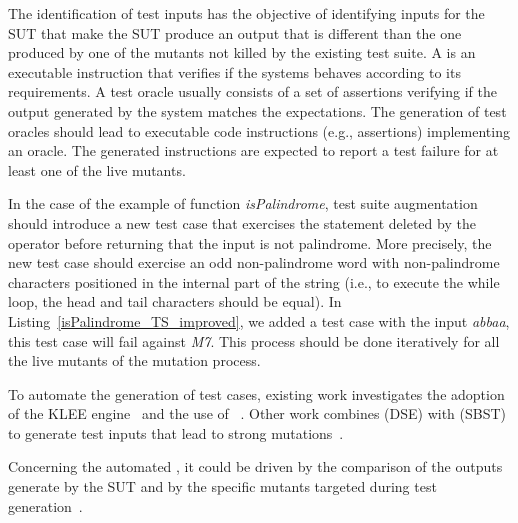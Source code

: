 The identification of test inputs has the objective of identifying inputs for the SUT that make the SUT produce an output that is different than the one produced by one of the mutants not killed by the existing test suite. 
A  is an executable instruction that verifies if the systems behaves according to its requirements. 
A test oracle usually consists of a set of assertions verifying if the output generated by the system matches the expectations.
The generation of test oracles should lead to executable code instructions (e.g., assertions) implementing an oracle. The generated instructions are expected to report a test failure for at least one of the live mutants.


In the case of the example of function \textit{isPalindrome}, test suite augmentation should introduce a new test case that 
exercises the statement deleted by the operator before returning that the input is not palindrome.
More precisely, the new test case should exercise an odd non-palindrome word with non-palindrome characters positioned in the internal part of the string (i.e., to execute the while loop, the head and tail characters should be equal). In Listing~\ref{isPalindrome_TS_improved}, we added a test case with the input \textit{abbaa}, this test case will fail against \textit{M7}. This process should be done iteratively for all the live mutants of the mutation process. 




 

To automate the generation of test cases, existing work investigates the adoption of the KLEE  engine~\cite{holling2016nequivack} and the use of ~\cite{riener2011test}. Other work combines  (DSE) with  (SBST) to generate test inputs that lead to strong mutations~\cite{harman2011strong}. 


Concerning the automated , 
it could be driven by the comparison of the outputs generate by the SUT and by the specific mutants targeted during test generation~\cite{Staats2012}.



